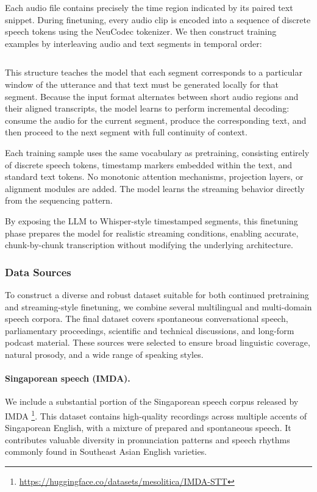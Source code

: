 \documentclass{article}
\begin{document}
Each audio file contains precisely the time region indicated by its paired text snippet. During finetuning, every audio clip is encoded into a sequence of discrete speech tokens using the NeuCodec tokenizer. We then construct training examples by interleaving audio and text segments in temporal order:

\begin{verbatim}
\end{verbatim}  

This structure teaches the model that each segment corresponds to a particular window of the utterance and that text must be generated locally for that segment. Because the input format alternates between short audio regions and their aligned transcripts, the model learns to perform incremental decoding: consume the audio for the current segment, produce the corresponding text, and then proceed to the next segment with full continuity of context.

Each training sample uses the same vocabulary as pretraining, consisting entirely of discrete speech tokens, timestamp markers embedded within the text, and standard text tokens. No monotonic attention mechanisms, projection layers, or alignment modules are added. The model learns the streaming behavior directly from the sequencing pattern.

By exposing the LLM to Whisper-style timestamped segments, this finetuning phase prepares the model for realistic streaming conditions, enabling accurate, chunk-by-chunk transcription without modifying the underlying architecture.

\subsubsection{Data Sources}
\label{sec:data-sources-streaming}

To construct a diverse and robust dataset suitable for both continued pretraining and streaming-style finetuning, we combine several multilingual and multi-domain speech corpora. The final dataset covers spontaneous conversational speech, parliamentary proceedings, scientific and technical discussions, and long-form podcast material. These sources were selected to ensure broad linguistic coverage, natural prosody, and a wide range of speaking styles.

\paragraph{Singaporean speech (IMDA).}
We include a substantial portion of the Singaporean speech corpus released by IMDA \footnote{ \url{https://huggingface.co/datasets/mesolitica/IMDA-STT}}. This dataset contains high-quality recordings across multiple accents of Singaporean English, with a mixture of prepared and spontaneous speech. It contributes valuable diversity in pronunciation patterns and speech rhythms commonly found in Southeast Asian English varieties.
\end{document}
